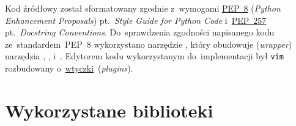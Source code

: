 \documentclass[thesis]{subfiles}
\begin{document}
Kod źródłowy został sformatowany zgodnie z~wymogami \href{https://www.python.org/dev/peps/pep-0008/}{PEP~8} (\emph{Python Enhancement Proposals}) pt.~\emph{Style Guide for Python Code} i~\href{https://www.python.org/dev/peps/pep-0257/}{PEP~257} pt.~\emph{Docstring Conventions}. Do~sprawdzenia zgodności napisanego kodu ze~standardem~PEP~8 wykorzystano narzędzie , który obudowuje (\emph{wrapper}) narzędzia , ,  i~. Edytorem kodu wykorzystanym do~implementacji był \texttt{vim} rozbudowany o~\href{http://vimawesome.com/}{wtyczki}~(\emph{plugins}).


\section{Wykorzystane biblioteki}
\end{document}
